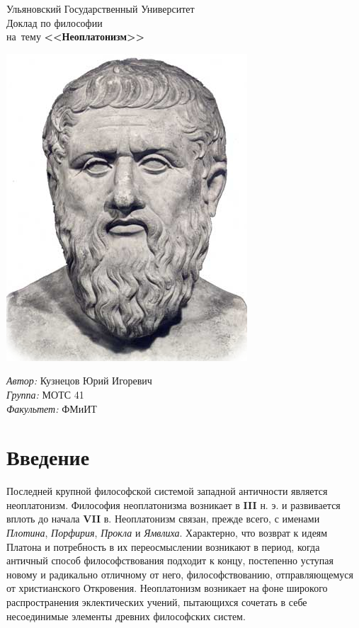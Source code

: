 \documentclass[a4paper,12pt]{article}
\begin{document}
\begin{titlepage}
\begin{center} 
\large Ульяновский Государственный Университет\\[4.5cm] 

\huge Доклад по философии\\[0.6cm] 
\large на~тему \textbf{<<Неоплатонизм>>}\\[1.7cm]
\begin{center}
\includegraphics[scale=0.5]{images/platon.jpg}
\end{center}
\end{center} 
\begin{minipage}{0.5\textwidth}
\begin{flushleft}
\vspace{20 mm}
\emph{Автор:} Кузнецов Юрий Игоревич\\
\emph{Группа:} МОТС 41\\
\emph{Факультет:} ФМиИТ\\
\end{flushleft}
\end{minipage}
\thispagestyle{empty}
\end{titlepage} 
\newpage
\tableofcontents
\newpage

\part{Введение}
Последней крупной  философской системой западной античности является неоплатонизм. Философия неоплатонизма возникает в \textbf{III} н. э. и развивается вплоть до начала \textbf{VII} в. Неоплатонизм связан, прежде всего, с именами \textit{Плотина}, \textit{Порфирия}, \textit{Прокла} и \textit{Ямвлиха}. Характерно, что возврат к идеям Платона и потребность в их переосмыслении возникают в период, когда античный способ философствования подходит к концу, постепенно уступая новому и радикально отличному от него, философствованию, отправляющемуся от христианского Откровения. Неоплатонизм возникает на фоне широкого распространения эклектических учений, пытающихся сочетать в себе несоединимые элементы древних философских систем.\\
\end{document}
